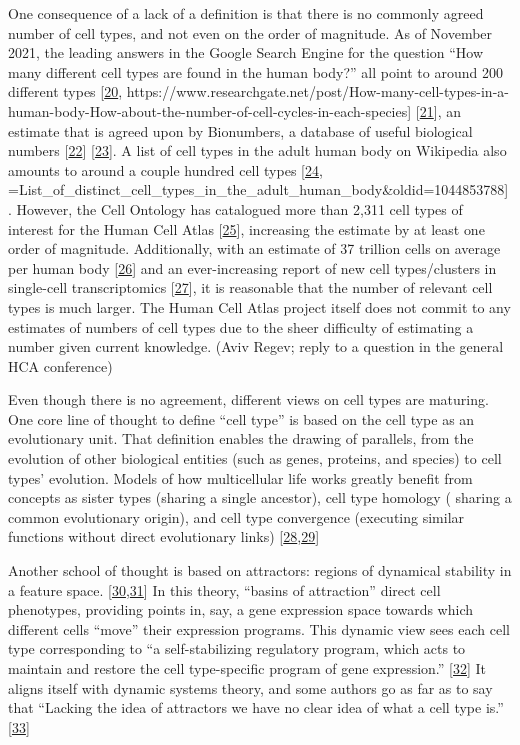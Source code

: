 One consequence of a lack of a definition is that there is no commonly agreed number of cell types, and not even on the order of magnitude.
As of November 2021, the leading answers in the Google Search Engine for the question ``How many different cell types are found in the human body?'' all point to around 200 different types {[}\protect\hyperlink{ref-V85zvNGa}{20}, https://www.researchgate.net/post/How-many-cell-types-in-a-human-body-How-about-the-number-of-cell-cycles-in-each-species{]} {[}\protect\hyperlink{ref-WBDY0Uoy}{21}{]}, an estimate that is agreed upon by Bionumbers, a database of useful biological numbers {[}\protect\hyperlink{ref-SprCx2w6}{22}{]} {[}\protect\hyperlink{ref-jePJgR0H}{23}{]}.
A list of cell types in the adult human body on Wikipedia also amounts to around a couple hundred cell types {[}\protect\hyperlink{ref-uYuz0opI}{24}, =List\_of\_distinct\_cell\_types\_in\_the\_adult\_human\_body\&oldid=1044853788{]}.
However, the Cell Ontology has catalogued more than 2,311 cell types of interest for the Human Cell Atlas {[}\protect\hyperlink{ref-J5X2Xu6M}{25}{]}, increasing the estimate by at least one order of magnitude.
Additionally, with an estimate of 37 trillion cells on average per human body {[}\protect\hyperlink{ref-xWhvkd3B}{26}{]} and an ever-increasing report of new cell types/clusters in single-cell transcriptomics {[}\protect\hyperlink{ref-HFiosSKK}{27}{]}, it is reasonable that the number of relevant cell types is much larger.
The Human Cell Atlas project itself does not commit to any estimates of numbers of cell types due to the sheer difficulty of estimating a number given current knowledge. (Aviv Regev; reply to a question in the general HCA conference)

Even though there is no agreement, different views on cell types are maturing.
One core line of thought to define ``cell type'' is based on the cell type as an evolutionary unit.
That definition enables the drawing of parallels, from the evolution of other biological entities (such as genes, proteins, and species) to cell types' evolution.
Models of how multicellular life works greatly benefit from concepts as sister types (sharing a single ancestor), cell type homology ( sharing a common evolutionary origin), and cell type convergence (executing similar functions without direct evolutionary links) {[}\protect\hyperlink{ref-O95WN4x0}{28},\protect\hyperlink{ref-ogAGO9KH}{29}{]}

Another school of thought is based on attractors: regions of dynamical stability in a feature space. {[}\protect\hyperlink{ref-14J9lsoMd}{30},\protect\hyperlink{ref-OjxQDZpx}{31}{]}
In this theory, ``basins of attraction'' direct cell phenotypes, providing points in, say, a gene expression space towards which different cells ``move'' their expression programs.
This dynamic view sees each cell type corresponding to ``a self-stabilizing regulatory program, which acts to maintain and restore the cell type-specific program of gene expression.'' {[}\protect\hyperlink{ref-19g5Iusf9}{32}{]}
It aligns itself with dynamic systems theory, and some authors go as far as to say that ``Lacking the idea of attractors we have no clear idea of what a cell type is.'' {[}\protect\hyperlink{ref-4TJnL1xT}{33}{]}

